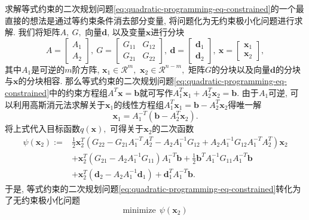 \documentclass{SBCbookchapter}
\newcommand{\V}[1]{{\bm{#1}}}
\newcommand{\R}{\mathcal{R}}
\numberwithin{equation}{section}
\begin{document}
求解等式约束的二次规划问题\eqref{eq:quadratic-programming-eq-constrained}的一个最直接的想法是通过等约束条件消去部分变量, 将问题化为无约束极小化问题进行求解. 我们将矩阵$A, ~ G,$ 向量$\V{d}$, 以及变量$\V{x}$进行分块
\begin{equation}
\label{eq:quadratic-programming-eq-blocks}
A = \begin{bmatrix} A_1 \\ A_2 \end{bmatrix}, ~ G = \begin{bmatrix} G_{11} & G_{12} \\ G_{21} & G_{22} \end{bmatrix}, ~ \V{d} = \begin{bmatrix} \V{d}_1 \\ \V{d}_2 \end{bmatrix}, ~ \V{x} = \begin{bmatrix} \V{x}_1 \\ \V{x}_2 \end{bmatrix},
\end{equation}
其中$A_1$是可逆的$m$阶方阵, $\V{x}_1 \in \R^{m},$ $\V{x}_2 \in \R^{n-m},$ 矩阵$G$的分块以及向量$\V{d}$的分块与$\V{x}$的分块相容. 那么等式约束的二次规划问题\eqref{eq:quadratic-programming-eq-constrained}中的约束方程组$A^T \V{x} = \V{b}$就可写作$A_1^T \V{x}_1 + A_2^T \V{x}_2 = \V{b}.$ 由于$A_1$可逆, 可以利用高斯消元法求解关于$\V{x}_1$的线性方程组$A_1^T \V{x}_1 = \V{b} - A_2^T \V{x}_2$得唯一解
\begin{equation}
\label{eq:quadratic-programming-eq-constrained-subs}
\V{x}_1 = A_1^{-T} (\V{b} - A_2^T \V{x}_2).
\end{equation}
将上式代入目标函数$q(\V{x}),$ 可得关于$\V{x}_2$的二次函数
\begin{equation}
\begin{aligned}
\psi (\V{x}_2) := & \frac{1}{2} \V{x}_2^T \left( G_{22} - G_{21} A_1^{-T} A_2^T - A_2 A_1^{-1} G_{12} + A_2 A_1^{-1} G_{12} A_1^{-T} A_2^T \right) \V{x}_2 \\
& + \V{x}_2^T \left( G_{21} - A_2 A_1^{-1} G_{11} \right) A_1^{-T} \V{b} + \frac{1}{2} \V{b}^T A_1^{-1} G_{11} A_1^{-T} \V{b} \\
& + \V{x}_2^T \left( \V{d}_2 - A_2 A_1^{-1} \V{d}_1 \right) + \V{d}_1^T A_1^{-T} \V{b}.
\end{aligned}
\end{equation}
于是, 等式约束的二次规划问题\eqref{eq:quadratic-programming-eq-constrained}转化为了无约束极小化问题
\begin{equation*}
\text{minimize} ~~ \psi(\V{x}_2)
\end{equation*}
\end{document}
